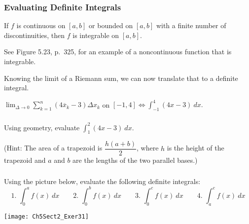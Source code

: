 \documentclass[14pt]{beamer}
\newcommand{\dint}{\displaystyle\int}
\begin{document}
\begin{frame}
\frametitle{\small Evaluating Definite Integrals}
\footnotesize
\begin{thm}
If $f$ is continuous on $[a,b]$ or bounded on $[a,b]$ with a finite number of discontinuities, then $f$ is integrable on $[a,b]$.
\end{thm}

\bigskip

See Figure 5.23, p.\ 325, for an example of a noncontinuous function that is integrable.

\bigskip

Knowing the limit of a Riemann sum, we can now translate that to a definite integral.

\begin{ex}$\displaystyle\lim_{\Delta  \to 0} \sum_{k=1}^n (4\overline{x}_k - 3)\Delta x_k$ on $[-1,4] \iff \dint_{-1}^4 (4x-3)\ dx.$ \end{ex}
\end{frame}

\begin{frame}%
\frametitle{}
\small
\begin{exe} Using geometry, evaluate $\dint_1^2 (4x-3)\ dx.$ 

\bigskip

(Hint:  The area of a trapezoid is $\dfrac{h(a+b)}{2}$, where $h$ is the height of the trapezoid and $a$ and $b$ are the lengths of the two parallel bases.)
\end{exe}
\end{frame}

\begin{frame}
\frametitle{}
\footnotesize
\begin{exe} Using the picture below, evaluate the following definite integrals:
\[\text{1.\ } \int_0^a f(x)\ dx \qquad \text{2.\ } \int_0^b f(x)\ dx \qquad \text{3.\ } \int_0^c f(x)\ dx \qquad \text{4.\ } \int_a^c f(x)\ dx\]

\begin{center}
\texttt{[image: Ch5Sect2\_Exer31]}
\end{center}
\end{exe}
\end{frame}
\end{document}
